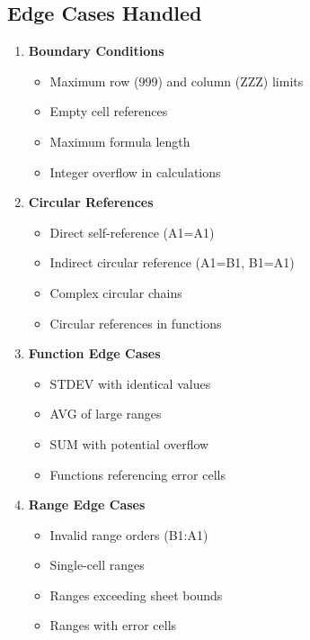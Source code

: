 \documentclass{article}
\begin{document}
\subsection{Edge Cases Handled}
\begin{enumerate}
    \item \textbf{Boundary Conditions}
    \begin{itemize}
        \item Maximum row (999) and column (ZZZ) limits
        \item Empty cell references
        \item Maximum formula length
        \item Integer overflow in calculations
    \end{itemize}

    \item \textbf{Circular References}
    \begin{itemize}
        \item Direct self-reference (A1=A1)
        \item Indirect circular reference (A1=B1, B1=A1)
        \item Complex circular chains
        \item Circular references in functions
    \end{itemize}

    \item \textbf{Function Edge Cases}
    \begin{itemize}
        \item STDEV with identical values
        \item AVG of large ranges
        \item SUM with potential overflow
        \item Functions referencing error cells
    \end{itemize}

    \item \textbf{Range Edge Cases}
    \begin{itemize}
        \item Invalid range orders (B1:A1)
        \item Single-cell ranges
        \item Ranges exceeding sheet bounds
        \item Ranges with error cells
    \end{itemize}
\end{enumerate}
\end{document}

